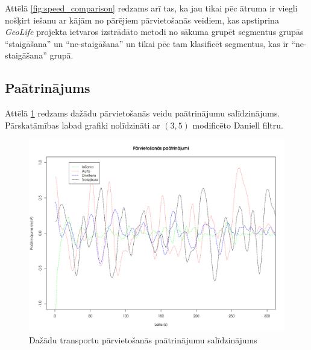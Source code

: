 \documentclass{ludis}
\begin{document}
Attēlā \ref{fig:speed_comparison} redzams arī tas, ka jau tikai pēc ātruma ir viegli nošķirt iešanu
ar kājām no pārējiem pārvietošanās veidiem, kas apstiprina \emph{GeoLife} projekta ietvaros
izstrādāto metodi no sākuma grupēt segmentus grupās ``staigāšana'' un ``ne-staigāšana'' un tikai
pēc tam klasificēt segmentus, kas ir ``ne-staigāšana'' grupā. ~\cite{zheng_gps_segmentation}

\subsection{Paātrinājums}
Attēlā \ref{fig:acceleration_comparison} redzams dažādu pārvietošanās veidu paātrinājumu 
salīdzinājums. Pārskatāmības labad grafiki nolīdzināti ar $(3, 5)$ modificēto Daniell filtru.

\begin{figure}
  \centering
  \includegraphics[scale=0.5]{img/acceleration_comparison}
  \caption{Dažādu transportu pārvietošanās paātrinājumu salīdzinājums}
  \label{fig:acceleration_comparison}
\end{figure}
\end{document}
